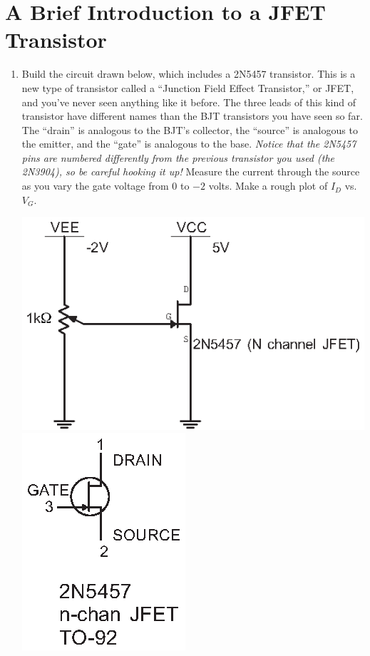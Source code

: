 \section{A Brief Introduction to a JFET Transistor}
\label{lab_jfet}


\bigskip

\begin{enumerate}[wide]

\item Build the circuit drawn below, which includes a 2N5457 transistor.  This is a new type of transistor called a ``Junction Field Effect Transistor,'' or JFET, and you've never seen anything like it before.  The three leads of this kind of transistor have different names than the BJT transistors you have seen so far.  The ``drain'' is analogous to the BJT's collector, the ``source'' is analogous to the emitter, and the ``gate'' is analogous to the base.  \textit{Notice that the 2N5457 pins are numbered differently from the previous transistor you used (the 2N3904), so be careful hooking it up!}  Measure the current through the source as you vary the gate voltage from 0 to $-2$ volts.  Make a rough plot of $I_D$ vs. $V_G$.
\begin{center}
\includegraphics{jfet/JFET_test_circuit.eps}
\includegraphics{appendices/pinouts/2N5457_pinout.eps}

\end{center}
\end{enumerate}
